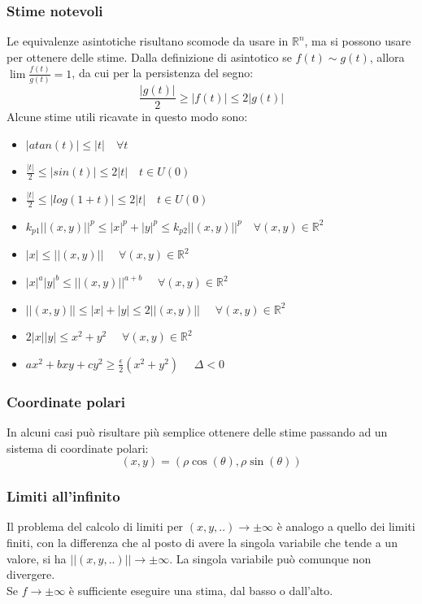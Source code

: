 \documentclass{article}
\newcommand{\R}{\mathds{R}}
\begin{document}
\subsubsection{Stime notevoli}
Le equivalenze asintotiche risultano scomode da usare in $\R^n$, ma si possono usare per ottenere delle stime. Dalla definizione di asintotico se $f(t)\sim g(t)$, allora $\lim \frac{f(t)}{g(t)}=1$, da cui per la persistenza del segno:
$$\frac{|g(t)|}{2}\geq|f(t)|\leq 2|g(t)| $$
Alcune stime utili ricavate in questo modo sono:
\begin{itemize}
    \item $|atan(t)|\leq |t|\quad\forall t$
    \item $\frac{|t|}{2}\leq |sin(t)|\leq 2|t|\quad t\in U(0)$
    \item $\frac{|t|}{2}\leq |log(1+t)|\leq 2|t|\quad t\in U(0)$
    \item $k_{p1}||(x,y)||^p\leq |x|^p+|y|^p\leq k_{p2}||(x,y)||^p\quad \forall (x,y)\in\R^2$
    \item $|x|\leq||(x,y)||$ $\quad\forall (x,y)\in\R^2$
    \item $|x|^a|y|^b\leq||(x,y)||^{a+b}$ $\quad\forall (x,y)\in\R^2$
    \item $||(x,y)||\leq |x|+|y|\leq 2||(x,y)||$ $\quad\forall (x,y)\in\R^2$
    \item $2|x||y|\leq x^2+y^2$ $\quad\forall (x,y)\in\R^2$
    \item $ax^2+bxy+cy^2\geq \frac{\epsilon}{2}(x^2+y^2)$ $\quad\Delta<0$
\end{itemize}


\subsubsection{Coordinate polari}
In alcuni casi può risultare più semplice ottenere delle stime passando ad un sistema di coordinate polari:
$$(x,y)=(\rho\cos(\theta), \rho\sin(\theta)) $$

\subsubsection{Limiti all'infinito}
Il problema del calcolo di limiti per $(x,y,..)\rightarrow\pm\infty$ è analogo a quello dei limiti finiti, con la differenza che al posto di avere la singola variabile che tende a un valore, si ha $||(x,y,..)||\rightarrow\pm\infty$. La singola variabile può comunque non divergere.\\
Se $f\rightarrow\pm\infty$ è sufficiente eseguire una stima, dal basso o dall'alto.
\end{document}
